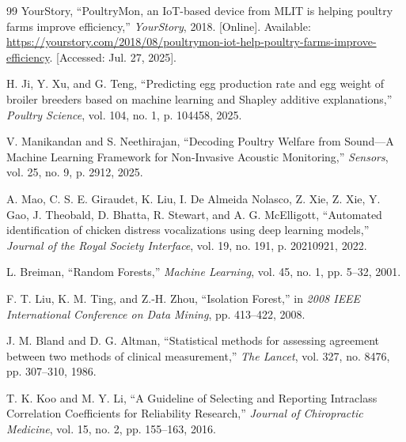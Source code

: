 \documentclass[../main.tex]{subfiles}
\begin{document}
\begin{thebibliography}{99}
YourStory, ``PoultryMon, an IoT-based device from MLIT is helping poultry farms improve efficiency,'' \textit{YourStory}, 2018. [Online]. Available: \url{https://yourstory.com/2018/08/poultrymon-iot-help-poultry-farms-improve-efficiency}. [Accessed: Jul. 27, 2025].

H. Ji, Y. Xu, and G. Teng, ``Predicting egg production rate and egg weight of broiler breeders based on machine learning and Shapley additive explanations,'' \textit{Poultry Science}, vol. 104, no. 1, p. 104458, 2025.

V. Manikandan and S. Neethirajan, ``Decoding Poultry Welfare from Sound---A Machine Learning Framework for Non-Invasive Acoustic Monitoring,'' \textit{Sensors}, vol. 25, no. 9, p. 2912, 2025.

A. Mao, C. S. E. Giraudet, K. Liu, I. De Almeida Nolasco, Z. Xie, Z. Xie, Y. Gao, J. Theobald, D. Bhatta, R. Stewart, and A. G. McElligott, ``Automated identification of chicken distress vocalizations using deep learning models,'' \textit{Journal of the Royal Society Interface}, vol. 19, no. 191, p. 20210921, 2022.

L. Breiman, ``Random Forests,'' \textit{Machine Learning}, vol. 45, no. 1, pp. 5--32, 2001.

F. T. Liu, K. M. Ting, and Z.-H. Zhou, ``Isolation Forest,'' in \textit{2008 IEEE International Conference on Data Mining}, pp. 413--422, 2008.

J. M. Bland and D. G. Altman, ``Statistical methods for assessing agreement between two methods of clinical measurement,'' \textit{The Lancet}, vol. 327, no. 8476, pp. 307--310, 1986.

T. K. Koo and M. Y. Li, ``A Guideline of Selecting and Reporting Intraclass Correlation Coefficients for Reliability Research,'' \textit{Journal of Chiropractic Medicine}, vol. 15, no. 2, pp. 155--163, 2016.

\end{thebibliography}
\endgroup
\end{document}
